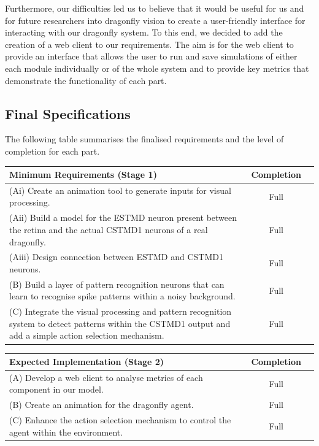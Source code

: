 \documentclass[a4paper,11pt]{article}
\begin{document}
	Furthermore, our difficulties led us to believe that it would be useful for us and for future researchers into dragonfly vision to create a user-friendly interface for interacting with our dragonfly system. To this end, we decided to add the creation of a web client to our requirements. The aim is for the web client to provide an interface that allows the user to run and save simulations of either each module individually or of the whole system and to provide key metrics that demonstrate the functionality of each part.
	
\subsection{Final Specifications}
The following table summarises the finalised requirements and the level of completion for each part.
\begin{center}
    \begin{tabular}{p{12cm} c c}
    \textbf{Minimum Requirements (Stage 1)} & \textbf{Completion} \\ \hline
    (Ai) Create an animation tool to generate inputs for visual processing. & Full \\ 
	(Aii) Build a model for the ESTMD neuron present between the retina and the actual CSTMD1 neurons of a real dragonfly. & Full \\
	(Aiii) Design connection between ESTMD and CSTMD1 neurons. & Full \\
	(B) Build a layer of pattern recognition neurons that can learn to recognise spike patterns within a noisy background. & Full\\
	(C) Integrate the visual processing and pattern recognition system to detect patterns within the CSTMD1 output and add a simple action selection mechanism. & Full\\
    \end{tabular}
\end{center}

\begin{center}
    \begin{tabular}{p{12cm} c c}
    \textbf{Expected Implementation (Stage 2)} & \textbf{Completion} \\ \hline
	(A) Develop a web client to analyse metrics of each component in our model. & Full \\
	(B) Create an animation for the dragonfly agent. & Full\\
	(C) Enhance the action selection mechanism to control the agent within the environment. & Full\\
    \end{tabular}
\end{center}
\end{document}
